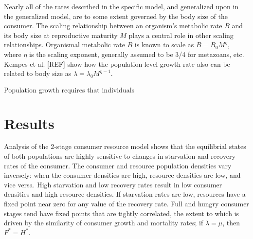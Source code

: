 \documentclass[12pt,english]{article}
\begin{document}
\begin{spacing}{1.9}
Nearly all of the rates described in the specific model, and generalized upon in the generalized model, are to some extent governed by the body size of the consumer.
The scaling relationship between an organism's metabolic rate $B$ and its body size at reproductive maturity $M$ plays a central role in other scaling relationships.
Organismal metabolic rate $B$ is known to scale as $B = B_0 M^\eta$, where $\eta$ is the scaling exponent, generally assumed to be 3/4 for metazoans, etc.
Kempes et al. [REF] show how the population-level growth rate also can be related to body size as $\lambda = \lambda_0 M^{\eta-1}$.

Population growth requires that individuals 




\section{Results}


Analysis of the 2-stage consumer resource model shows that the equilibrial states of both populations are highly sensitive to changes in  starvation and recovery rates of the consumer.
The consumer and resource population densities vary inversely: when the consumer densities are high, resource densities are low, and vice versa.
High starvation and low recovery rates result in low consumer densities and high resource densities. %
If starvation rates are low, resources have a fixed point near zero for any value of the recovery rate.
Full and hungry consumer stages tend have fixed points that are tightly correlated, the extent to which is driven by the similarity of consumer growth and mortality rates; if $\lambda = \mu$, then $F^* = H^*$.


\end{spacing}
\end{document}

